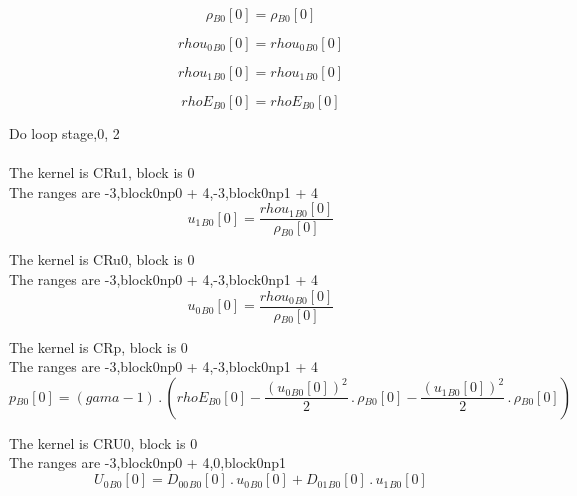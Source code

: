 \documentclass{article}
\begin{document}
\begin{dmath}{\rho{_{B0}}}[{0}] = {\rho{_{B0}}}[{0}]\end{dmath}

\begin{dmath}{rhou_{0}{_{B0}}}[{0}] = {rhou_{0}{_{B0}}}[{0}]\end{dmath}

\begin{dmath}{rhou_{1}{_{B0}}}[{0}] = {rhou_{1}{_{B0}}}[{0}]\end{dmath}

\begin{dmath}{rhoE{_{B0}}}[{0}] = {rhoE{_{B0}}}[{0}]\end{dmath}

\noindent Do loop stage,0, 2\\
\\\noindent The kernel is CRu1, block is 0\\\noindent The ranges are -3,block0np0 + 4,-3,block0np1 + 4\\\begin{dmath}{u_{1}{_{B0}}}[{0}] = \frac{{rhou_{1}{_{B0}}}[{0}]}{{\rho{_{B0}}}[{0}]}\end{dmath}

\noindent The kernel is CRu0, block is 0\\\noindent The ranges are -3,block0np0 + 4,-3,block0np1 + 4\\\begin{dmath}{u_{0}{_{B0}}}[{0}] = \frac{{rhou_{0}{_{B0}}}[{0}]}{{\rho{_{B0}}}[{0}]}\end{dmath}

\noindent The kernel is CRp, block is 0\\\noindent The ranges are -3,block0np0 + 4,-3,block0np1 + 4\\\begin{dmath}{p{_{B0}}}[{0}] = \left(gama - 1\right) \,.\, \left({rhoE{_{B0}}}[{0}] - \frac{\left({u_{0}{_{B0}}}[{0}] \right)^{2}}{2} \,.\, {\rho{_{B0}}}[{0}] - \frac{\left({u_{1}{_{B0}}}[{0}] \right)^{2}}{2} \,.\, 
{\rho{_{B0}}}[{0}]\right)\end{dmath}

\noindent The kernel is CRU0, block is 0\\\noindent The ranges are -3,block0np0 + 4,0,block0np1\\\begin{dmath}{U_{0}{_{B0}}}[{0}] = {D_{00}{_{B0}}}[{0}] \,.\, {u_{0}{_{B0}}}[{0}] + {D_{01}{_{B0}}}[{0}] \,.\, {u_{1}{_{B0}}}[{0}]\end{dmath}
\end{document}
